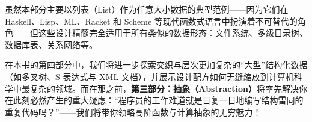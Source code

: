 虽然本部分主要以列表（List）作为任意大小数据的典型范例——因为它们在 Haskell、Lisp、ML、Racket 和 Scheme 等现代函数式语言中扮演着不可替代的角色——但这些设计精髓完全适用于所有类似的数据形态：文件系统、多级目录树、数据库表、关系网络等。

在本书的第四部分中，我们将进一步探索交织与层次更加复杂的“大型”结构化数据（如多叉树、S-表达式与 XML 文档），并展示设计配方如何无缝缩放到计算机科学中最复杂的领域。而在那之前，\textbf{第三部分：抽象（Abstraction）}将率先解决你在此刻必然产生的重大疑虑：\enquote{程序员的工作难道就是日复一日地编写结构雷同的重复代码吗？}——我们将带你领略高阶函数与计算抽象的无穷魅力！
